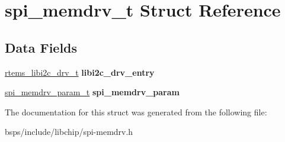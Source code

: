 \hypertarget{structspi__memdrv__t}{}\section{spi\+\_\+memdrv\+\_\+t Struct Reference}
\label{structspi__memdrv__t}
\subsection*{Data Fields}
\begin{DoxyCompactItemize}
\item 
\mbox{\label{structspi__memdrv__t_a0fb168f47d67c8aae1c4a3f872db6664}} 
\mbox{\hyperlink{structrtems__libi2c__drv__t__}{rtems\+\_\+libi2c\+\_\+drv\+\_\+t}} {\bfseries libi2c\+\_\+drv\+\_\+entry}
\item 
\mbox{\label{structspi__memdrv__t_a36059ba763225467c3ca6b0ac1e26f22}} 
\mbox{\hyperlink{structspi__memdrv__param__t}{spi\+\_\+memdrv\+\_\+param\+\_\+t}} {\bfseries spi\+\_\+memdrv\+\_\+param}
\end{DoxyCompactItemize}


The documentation for this struct was generated from the following file\+:\begin{DoxyCompactItemize}
\item 
bsps/include/libchip/spi-\/memdrv.\+h\end{DoxyCompactItemize}
